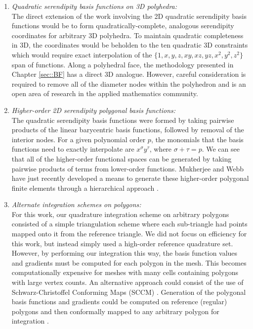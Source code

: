 \begin{enumerate}
\item {\em Quadratic serendipity basis functions on 3D polyhedra:} \\
The direct extension of the work involving the 2D quadratic serendipity basis functions would be to form quadratically-complete, analogous serendipity coordinates for arbitrary 3D polyhedra. To maintain quadratic completeness in 3D, the coordinates would be beholden to the ten quadratic 3D constraints which would require exact interpolation of the $\{ 1,x,y,z,xy,xz,yz,x^2,y^2,z^2 \}$ span of functions. Along a polyhedral face, the methodology presented in Chapter \ref{sec::BF} has a direct 3D analogue. However, careful consideration is required to remove all of the diameter nodes within the polyhedron and is an open area of research in the applied mathematics community.
\item {\em Higher-order 2D serendipity polygonal basis functions:} \\
The quadratic serendipity basis functions were formed by taking pairwise products of the linear barycentric basis functions, followed by removal of the interior nodes. For a given polynomial order $p$, the monomials that the basis functions need to exactly interpolate are $x^\sigma y^\tau$, where $\sigma + \tau = p$. We can see that all of the higher-order functional spaces can be generated by taking pairwise products of terms from lower-order functions. Mukherjee and Webb have just recently developed a means to generate these higher-order polygonal finite elements through a hierarchical approach \cite{mukherjee2015hierarchical}.
\item {\em Alternate integration schemes on polygons:} \\
For this work, our quadrature integration scheme on arbitrary polygons consisted of a simple triangulation scheme where each sub-triangle had points mapped onto it from the reference triangle. We did not focus on efficiency for this work, but instead simply used a high-order reference quadrature set. However, by performing our integration this way, the basis function values and gradients must be computed for each polygon in the mesh. This becomes computationally expensive for meshes with many cells containing polygons with large vertex counts. An alternative approach could consist of the use of Schwarz-Christoffel Conforming Maps (SCCM) \cite{driscoll2002schwarz,driscoll2005algorithm}. Generation of the polygonal basis functions and gradients could be computed on reference (regular) polygons and then conformally mapped to any arbitrary polygon for integration \cite{natarajan2009numerical}.

\end{enumerate}
